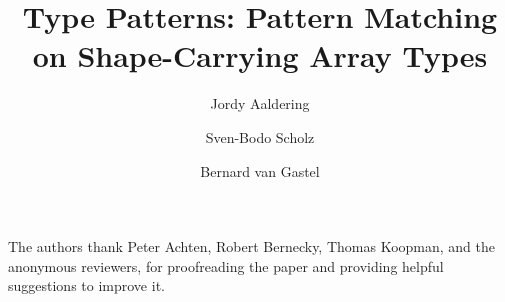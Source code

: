 \documentclass[sigconf,screen]{acmart}
\title{Type Patterns: Pattern Matching on Shape-Carrying Array Types}
\author{Jordy Aaldering}
\affiliation{%
    \institution{Radboud University}
    \city{Nijmegen}
    \country{Netherlands}
}
\author{Sven-Bodo Scholz}
\affiliation{%
    \institution{Radboud University}
    \city{Nijmegen}
    \country{Netherlands}
}
\author{Bernard van Gastel}
\affiliation{%
    \institution{Radboud University}
    \city{Nijmegen}
    \country{Netherlands}
}
\begin{document}


\maketitle















\begin{acks}
The authors thank Peter Achten, Robert Bernecky, Thomas Koopman, and the anonymous reviewers, for proofreading the paper and providing helpful suggestions to improve it.
\end{acks}



\end{document}
